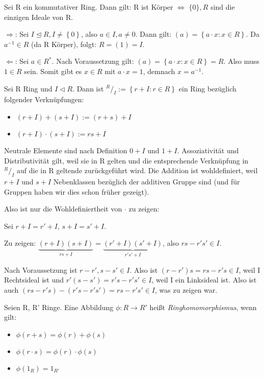 \documentclass[10pt]{scrbook}
\begin{document}
\begin{Sa}
Sei R ein kommutativer Ring. Dann gilt: R ist Körper $\Leftrightarrow$ $\{0\}, R$ sind die einzigen Ideale von R.\label{sa:ring_koerper}
\end{Sa}
\begin{bew}
$\Rightarrow$: Sei $I\trianglelefteq R, I\neq \left\{0\right\}$, also $a\in I, a\neq 0$. Dann gilt: $\left(a\right)=\left\{a\cdot x: x\in R\right\}$. Da $a^{-1}\in R$ (da R Körper), folgt: $R=\left(1\right)=I$.

$\Leftarrow$: Sei $a\in R^*$. Nach Voraussetzung gilt: $\left(a\right)=\left\{a\cdot x: x\in R\right\}=R$. Also muss $1\in R$ sein. Somit gibt es $x\in R$ mit $a\cdot x=1$, demnach $x=a^{-1}$.
\end{bew}

\begin{Sa}
Sei R Ring und $I\triangleleft R$. Dann ist ${}^R/_I:=\left\{r+I:r\in R\right\}$ ein Ring bezüglich folgender Verknüpfungen:
\begin{itemize}
	\item $(r+I)+(s+I):=(r+s)+I$
	\item $(r+I)\cdot (s+I):=r s+I$
\end{itemize}
\end{Sa}
\begin{bew}
Neutrale Elemente sind nach Definition $0+I$ und $1+I$. Assoziativität und Distributivität gilt, weil sie in R gelten und die entsprechende Verknüpfung in ${}^R/_I$ auf die in R geltende zurückgeführt wird. Die Addition ist wohldefiniert, weil $r+I$ und $s+I$ Nebenklassen bezüglich der additiven Gruppe sind (und für Gruppen haben wir dies schon früher gezeigt). 

Also ist nur die Wohldefiniertheit von $\cdot$ zu zeigen:

Sei $r+I=r'+I$, $s+I=s'+I$.

Zu zeigen: $\underbrace{(r+I) (s+I)}_{r s+I}=\underbrace{(r'+I) (s'+I)}_{r' s'+I}$, also $r s-r' s'\in I$.

Nach Voraussetzung ist $r-r', s-s'\in I$. Also ist $(r-r') s=r s-r' s\in I$, weil I Rechtsideal ist und $r' (s-s')=r' s-r' s'\in I$, weil I ein Linksideal ist. Also ist auch $(r s-r' s)-(r' s-r' s')=r s-r' s'\in I$, was zu zeigen war.
\end{bew}

\begin{Def}
Seien R, R' Ringe. Eine Abbildung $\phi: R \rightarrow R'$ heißt \emph{Ringhomomorphismus}, wenn gilt:
\begin{itemize}
	\item $\phi(r+s)=\phi(r)+\phi(s)$
	\item $\phi(r\cdot s)=\phi(r)\cdot\phi(s)$
	\item $\phi(1_R)=1_{R'}$
\end{itemize}
\end{Def}
\end{document}
